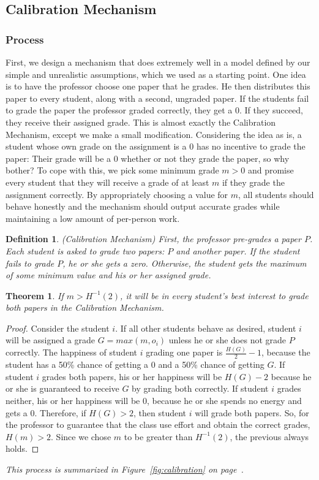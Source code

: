 \documentclass[12pt, Arial]{article}
\newtheorem{theorem}{Theorem}
\newtheorem{definition}{Definition}
\begin{document}
\subsection{Calibration Mechanism}
\label{sec:calibration}

\subsubsection{Process}
First, we design a mechanism that does extremely well in a model defined by our simple and unrealistic assumptions, which we used as a starting point.
One idea is to have the professor choose one paper that he grades. He then distributes this paper to every student, along with a second, ungraded paper. If the students fail to grade the paper the professor graded correctly, they get a 0. If they succeed, they receive their assigned grade.
This is almost exactly the Calibration Mechanism, except we make a small modification. Considering the idea as is, a student whose own grade on the assignment is a 0 has no incentive to grade the paper: Their grade will be a 0 whether or not they grade the paper, so why bother? To cope with this, we pick some minimum grade $m > 0$ and promise every student that they will receive a grade of at least $m$ if they grade the assignment correctly.
By appropriately choosing a value for $m$, all students should behave honestly and the mechanism should output accurate grades while maintaining a low amount of per-person work.
\begin{definition}(Calibration Mechanism)
First, the professor pre-grades a paper $P$. Each student is asked to grade two papers: $P$ and another paper. If the student fails to grade $P$, he or she gets a zero. Otherwise, the student gets the maximum of some minimum value and his or her assigned grade.
\end{definition}
\begin{theorem}
If $m>H^{-1}(2)$, it will be in every student's best interest to grade both papers in the Calibration Mechanism.
\end{theorem}
\begin{proof}
Consider the student $i$.
If all other students behave as desired, student $i$ will be assigned a grade $G=max(m,o_i)$ unless he or she does not grade $P$ correctly.
The happiness of student $i$ grading one paper is $\frac{H(G)}{2}-1$, because the student has a 50\% chance of getting a 0 and a 50\% chance of getting $G$.
If student $i$ grades both papers, his or her happiness will be $H(G)-2$ because he or she is guaranteed to receive $G$ by grading both correctly.
If student $i$ grades neither, his or her happiness will be $0$, because he or she spends no energy and gets a 0.
Therefore, if $H(G) > 2$, then student $i$ will grade both papers. So, for the professor to guarantee that the class use effort and obtain the correct grades, $H(m) > 2$.
Since we chose $m$ to be greater than $H^{-1}(2)$, the previous always holds.
\end{proof}
\emph{This process is summarized in Figure~\ref{fig:calibration} on page~\pageref{fig:calibration}.}
\end{document}
